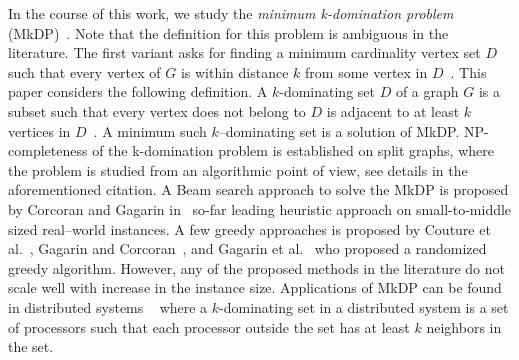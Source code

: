 \documentclass[sigconf]{acmart}
\begin{document}
In the course of this work, we study the \emph{minimum k-domination problem} (MkDP)~\cite{corcoran2021heuristics}.  Note that the definition for this problem is ambiguous in the literature. The first variant asks for finding a minimum cardinality vertex set $ D$ such that every vertex of $G$ is within distance $k$ from some vertex in $D$~\cite{chang1983k}. 
This paper considers the following definition.  A $k$-dominating set  $D$ of a graph $G$ is a subset such that every vertex does not belong to $D$ is adjacent to at least $k$ vertices in  $D$~\cite{lan2013algorithmic}. A minimum such $k$--dominating set is a solution of MkDP.  NP-completeness of the k-domination problem is established on split graphs, where the problem is studied from an algorithmic point of view, see details in the aforementioned citation. A Beam search approach to solve the MkDP is proposed by Corcoran and Gagarin   in~\cite{corcoran2021heuristics} so-far leading heuristic approach on small-to-middle sized real--world instances. A few greedy approaches is proposed by Couture et al.~\cite{couture2006incremental}, Gagarin and Corcoran~\cite{gagarin2018multiple}, and  Gagarin et al.~\cite{gagarin2013randomized} who proposed a randomized greedy algorithm. However, any of the proposed methods in the literature do not scale well with increase in the instance size.   
Applications of MkDP can be found in  distributed systems  ~\cite{wang2013minimising} where  a $k$-dominating set in a distributed system is a set of processors such that each processor outside the set has at least $k$ neighbors in the set.
\end{document}
